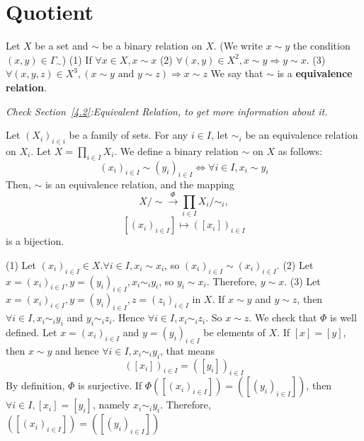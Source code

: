 \documentclass{book}
\numberwithin{equation}{section}
\begin{document}
\section{Quotient}\label{5.5}
\begin{definitionenv}
    Let $X$ be a set and $\sim$ be a binary relation on $X$. (We write $x\sim y$ the condition $(x,y)\in \Gamma_\sim$)
    \newline
    (1) If $\forall x\in X, x\sim x$
    \newline
    (2) $\forall (x,y)\in X^2, x\sim y\Rightarrow y\sim x$.
    \newline
    (3) $\forall (x,y,z)\in X^3, (x\sim y \text{ and } y\sim z )\Rightarrow x\sim z$
    \newline
    We say that $\sim $ is a \textbf{equivalence relation}.
\end{definitionenv}
\textit{Check Section~\ref{4.2}:Equivalent Relation, to get more information about it.}
\begin{propositionenv}
    Let $(X_i)_{i\in i}$ be a family of sets. For any $i\in I$, let $\sim_i$ be an equivalence relation on $X_i$. Let $X=\prod_{i\in I}X_i$. We define a binary relation $\sim$ on $X$ as follows:
    $$(x_i)_{i\in I}\sim (y_i)_{i\in I}\Leftrightarrow \forall i\in I, x_i\sim y_i$$
    Then, $\sim $ is an equivalence relation, and the mapping
    $$X/\sim \overset{\Phi}{\longrightarrow }\prod_{i\in I}X_i/\sim_i,$$
    $$ [(x_i)_{i\in I}]\longmapsto  ([x_i])_{i\in I}$$
    is a bijection.
\end{propositionenv}
\begin{proofenv}
    \quad
    \newline
    (1) Let $(x_i)_{i\in I}\in X. \forall i\in I,x_i\sim x_i$, so $(x_i)_{i\in I}\sim(x_i)_{i\in I}$.
    \newline
    (2) Let $x=(x_i)_{i\in I},y=(y_i)_{i\in I}, x_i\sim_i y_i$, so $y_i\sim x_i$. Therefore, $y\sim x$.
    \newline 
    (3) Let $x=(x_i)_{i\in I},y=(y_i)_{i\in I},z=(z_i)_{i\in I}$ in $X$. If $x\sim y$ and $y\sim z$, then $\forall i \in I,x_i\sim_i y_i$ and $y_i\sim_i z_i$. Hence $\forall i \in I, x_i\sim_i z_i$. So $x\sim z$.
    \newline
    We check that $\Phi$ is well defined. Let $x=(x_i)_{i\in I}$ and $y=(y_i)_{i\in I}$ be elements of $X$. If $[x]=[y]$, then $x\sim y$ and hence $\forall i\in I, x_i\sim_i y_i$, that means 
    $$([x_i])_{i\in I}=([y_i])_{i\in I}$$
    By definition, $\Phi$ is surjective. If $\Phi([(x_i)_{i\in I}])=([(y_i)_{i\in I}])$, then $\forall i\in I, [x_i]=[y_i]$, namely $x_i\sim_i y_i$. Therefore, $([(x_i)_{i\in I}])=([(y_i)_{i\in I}])$
\end{proofenv}
\end{document}
